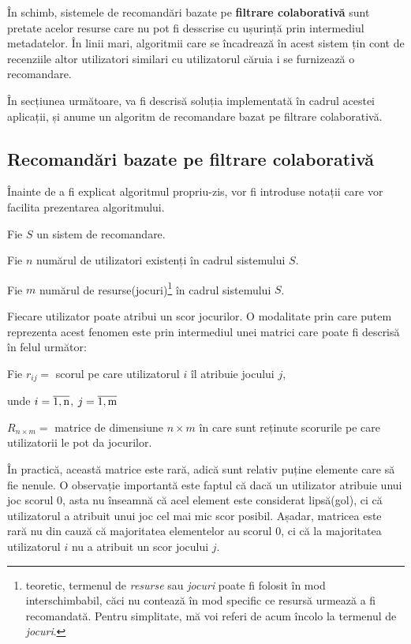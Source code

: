\documentclass[12pt,a4paper]{report}
\begin{document}
În schimb, sistemele de recomandări bazate pe \textbf{filtrare colaborativă} sunt pretate acelor resurse care nu pot fi desscrise cu ușurință prin intermediul metadatelor. În linii mari, algoritmii care se încadrează în acest sistem țin cont de recenziile altor utilizatori similari cu utilizatorul căruia i se furnizează o recomandare.

În secțiunea următoare, va fi descrisă soluția implementată în cadrul acestei aplicații, și anume un algoritm de recomandare bazat pe filtrare colaborativă.

\subsection{Recomandări bazate pe filtrare colaborativă}


   Înainte de a fi explicat algoritmul propriu-zis, vor fi introduse notații care vor facilita prezentarea algoritmului. 

\bigskip
\bigskip

Fie \( S \) un sistem de recomandare.

Fie \( n \) numărul de utilizatori existenți în cadrul sistemului \(S \).

Fie \( m \) numărul de resurse(jocuri)\footnote{teoretic, termenul de \emph{resurse} sau \emph{jocuri} poate fi folosit în mod interschimbabil, căci nu contează în mod specific ce resursă urmează a fi recomandată. Pentru simplitate, mă voi referi de acum încolo la termenul de \emph{jocuri}.}
 în cadrul sistemului \( S \).

\bigskip
\bigskip

\noindent Fiecare utilizator poate atribui un scor jocurilor. O modalitate prin care putem reprezenta acest fenomen este prin intermediul unei matrici care poate fi descrisă în felul următor:

\bigskip
\bigskip

Fie \( r_{ij} =  \) scorul pe care utilizatorul \( i \) îl atribuie jocului \( j \),

unde \( i = \overline{\rm 1,n} \), \( j = \overline{\rm 1,m} \)

\( R_{n \times m} = \) matrice de dimensiune \( n \times m\) în care sunt reținute scorurile pe care utilizatorii le pot da jocurilor.

\bigskip
\bigskip


\noindent În practică, această matrice este rară, adică sunt relativ puține elemente care să fie nenule. O observație importantă este faptul că dacă un utilizator atribuie unui joc scorul 0, asta nu înseamnă că acel element este considerat lipsă(gol), ci că utilizatorul a atribuit unui joc cel mai mic scor posibil. Așadar, matricea este rară nu din cauză că majoritatea elementelor au scorul 0, ci că la majoritatea utilizatorul \( i \) nu a atribuit un scor jocului \( j \).
\end{document}
